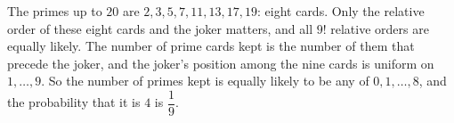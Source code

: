 The primes up to $20$ are $2,3,5,7,11,13,17,19$: eight cards. Only the relative order of these eight cards and the joker matters, and all $9!$ relative orders are equally likely. The number of prime cards kept is the number of them that precede the joker, and the joker's position among the nine cards is uniform on $1,\dots,9$. So the number of primes kept is equally likely to be any of $0,1,\dots,8$, and the probability that it is $4$ is $\boxed{\dfrac{1}{9}}$.
